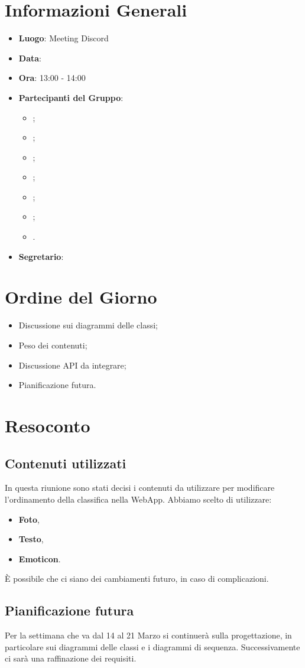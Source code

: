 \section{Informazioni Generali}

\begin{itemize}
	\item{\textbf{Luogo}}: Meeting Discord
	\item{\textbf{Data}}: \D
	\item{\textbf{Ora}}: 13:00 - 14:00
	\item{\textbf{Partecipanti del Gruppo}}:
	\begin{itemize}
		\item{\EP{};}
		\item{\FP{};}
		\item{\GC{};}
		\item{\LW{};}
		\item{\MB{};}
		\item{\MG{};}
		\item{\PV{}.}
	\end{itemize}
	\item{\textbf{Segretario}}: \PV{}
\end{itemize}

\section{Ordine del Giorno}
\begin{itemize}
	\item{Discussione sui diagrammi delle classi;}
	\item{Peso dei contenuti;}
	\item{Discussione API da integrare;}
	\item{Pianificazione futura.}
\end{itemize}

\section{Resoconto}

\subsection{Contenuti utilizzati}
In questa riunione sono stati decisi i contenuti da utilizzare per modificare l'ordinamento della classifica nella WebApp. Abbiamo scelto di utilizzare:
\begin{itemize}
	\item {\textbf{Foto},}
	\item {\textbf{Testo},}
	\item {\textbf{Emoticon}.}
\end{itemize}
È possibile che ci siano dei cambiamenti futuro, in caso di complicazioni.


\subsection{Pianificazione futura}
Per la settimana che va dal 14 al 21 Marzo si continuerà sulla progettazione, in particolare sui diagrammi delle classi e i diagrammi di sequenza.
Successivamente ci sarà una raffinazione dei requisiti.